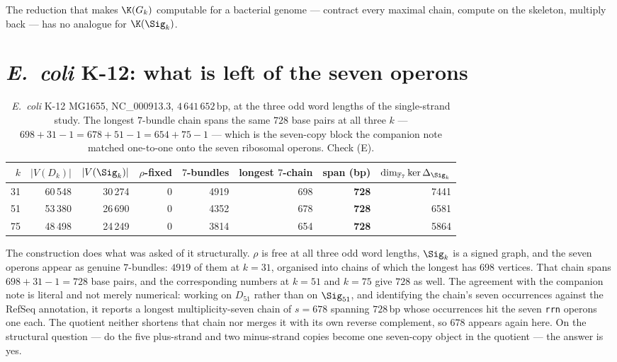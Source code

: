 \begin{corollary}\label{Bio7:cor:nocompute}
The reduction that makes $\K(G_k)$ computable for a bacterial genome --- contract every
maximal chain, compute on the skeleton, multiply back --- has no analogue for $\K(\Sig_k)$.
\end{corollary}

\section{\emph{E.\ coli} K-12: what is left of the seven operons}

\begin{table}[t]
\centering
\begin{tabular}{rrrrrrrr}
\toprule
$k$ & $|V(D_k)|$ & $|V(\Sig_k)|$ & $\rho$-fixed & $7$-bundles & longest $7$-chain
& span (bp) & $\dim_{\mathbb{F}_7}\ker\Delta_{\Sig_k}$\\
\midrule
31 & 60\,548 & 30\,274 & 0 & 4919 & 698 & \textbf{728} & 7441\\
51 & 53\,380 & 26\,690 & 0 & 4352 & 678 & \textbf{728} & 6581\\
75 & 48\,498 & 24\,249 & 0 & 3814 & 654 & \textbf{728} & 5864\\
\bottomrule
\end{tabular}
\caption{\emph{E.\ coli} K-12 MG1655, NC\_000913.3, $4\,641\,652$\,bp, at the three odd word
lengths of the single-strand study. The longest $7$-bundle chain spans the same $728$
base pairs at all three $k$ --- $698+31-1=678+51-1=654+75-1$ --- which is the seven-copy
block the companion note matched one-to-one onto the seven ribosomal operons. Check (E).}
\label{Bio7:tab:ecoli}
\end{table}

The construction does what was asked of it structurally. $\rho$ is free at all three odd word
lengths, $\Sig_k$ is a signed graph, and the seven operons appear as genuine $7$-bundles:
$4919$ of them at $k=31$, organised into chains of which the longest has $698$ vertices. That
chain spans $698+31-1=728$ base pairs, and the corresponding numbers at $k=51$ and $k=75$
give $728$ as well. The agreement with the companion note is literal and not merely
numerical: working on $D_{51}$ rather than on $\Sig_{51}$, and identifying the chain's seven
occurrences against the RefSeq annotation, it reports a longest multiplicity-seven chain of
$s=678$ spanning $728$\,bp whose occurrences hit the seven \texttt{rrn} operons one each.
The quotient neither shortens that chain nor merges it with its own reverse complement, so
$678$ appears again here. On the structural question --- do the five plus-strand and two
minus-strand copies become one seven-copy object in the quotient --- the answer is yes.

